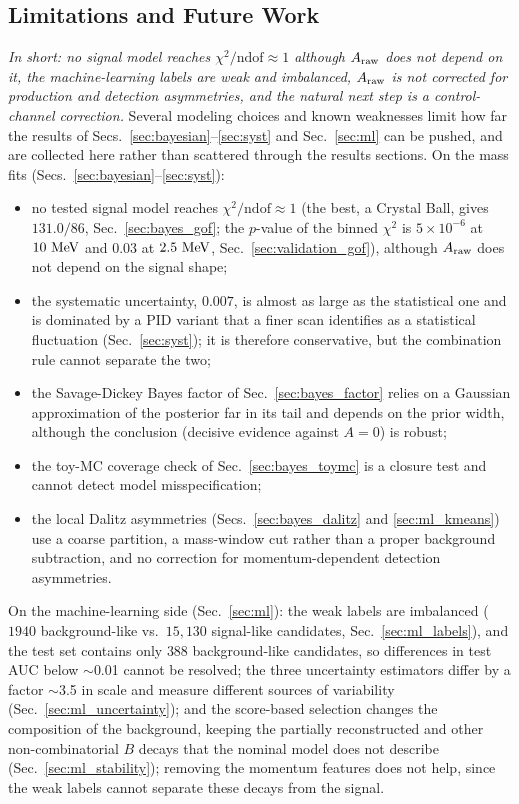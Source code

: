 \subsection{Limitations and Future Work}
\label{sec:limitations}
\emph{In short: no signal model reaches $\chi^2/\mathrm{ndof}\approx1$ although $A_{\mathrm{raw}}$ does not depend on it, the machine-learning labels are weak and imbalanced, $A_{\mathrm{raw}}$ is not corrected for production and detection asymmetries, and the natural next step is a control-channel correction.}
Several modeling choices and known weaknesses limit how far the results of Secs.~\ref{sec:bayesian}--\ref{sec:syst} and Sec.~\ref{sec:ml} can be pushed, and are collected here rather than scattered through the results sections.
On the mass fits (Secs.~\ref{sec:bayesian}--\ref{sec:syst}):
\begin{itemize}[leftmargin=*,itemsep=2pt]
\item no tested signal model reaches $\chi^2/\mathrm{ndof}\approx1$ (the best, a Crystal Ball, gives $131.0/86$, Sec.~\ref{sec:bayes_gof}; the $p$-value of the binned $\chi^2$ is $5\times10^{-6}$ at $10\,\,\text{Me\hspace{-.08em}V}$ and $0.03$ at $2.5\,\,\text{Me\hspace{-.08em}V}$, Sec.~\ref{sec:validation_gof}), although $A_{\mathrm{raw}}$ does not depend on the signal shape;
\item the systematic uncertainty, $0.007$, is almost as large as the statistical one and is dominated by a PID variant that a finer scan identifies as a statistical fluctuation (Sec.~\ref{sec:syst}); it is therefore conservative, but the combination rule cannot separate the two;
\item the Savage-Dickey Bayes factor of Sec.~\ref{sec:bayes_factor} relies on a Gaussian approximation of the posterior far in its tail and depends on the prior width, although the conclusion (decisive evidence against $A=0$) is robust;
\item the toy-MC coverage check of Sec.~\ref{sec:bayes_toymc} is a closure test and cannot detect model misspecification;
\item the local Dalitz asymmetries (Secs.~\ref{sec:bayes_dalitz} and \ref{sec:ml_kmeans}) use a coarse partition, a mass-window cut rather than a proper background subtraction, and no correction for momentum-dependent detection asymmetries.
\end{itemize}
On the machine-learning side (Sec.~\ref{sec:ml}): the weak labels are imbalanced ($1940$ background-like vs.\ $15{,}130$ signal-like candidates, Sec.~\ref{sec:ml_labels}), and the test set contains only $388$ background-like candidates, so differences in test AUC below $\sim$0.01 cannot be resolved; the three uncertainty estimators differ by a factor $\sim$3.5 in scale and measure different sources of variability (Sec.~\ref{sec:ml_uncertainty}); and the score-based selection changes the composition of the background, keeping the partially reconstructed and other non-combinatorial $B$ decays that the nominal model does not describe (Sec.~\ref{sec:ml_stability}); removing the momentum features does not help, since the weak labels cannot separate these decays from the signal.
